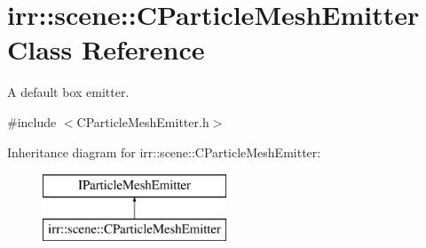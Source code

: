 \hypertarget{classirr_1_1scene_1_1_c_particle_mesh_emitter}{\section{irr\-:\-:scene\-:\-:C\-Particle\-Mesh\-Emitter Class Reference}
\label{classirr_1_1scene_1_1_c_particle_mesh_emitter}
}


A default box emitter.  




{\ttfamily \#include $<$C\-Particle\-Mesh\-Emitter.\-h$>$}

Inheritance diagram for irr\-:\-:scene\-:\-:C\-Particle\-Mesh\-Emitter\-:\begin{figure}[H]
\begin{center}
\leavevmode
\includegraphics[height=2.000000cm]{classirr_1_1scene_1_1_c_particle_mesh_emitter}
\end{center}
\end{figure}
